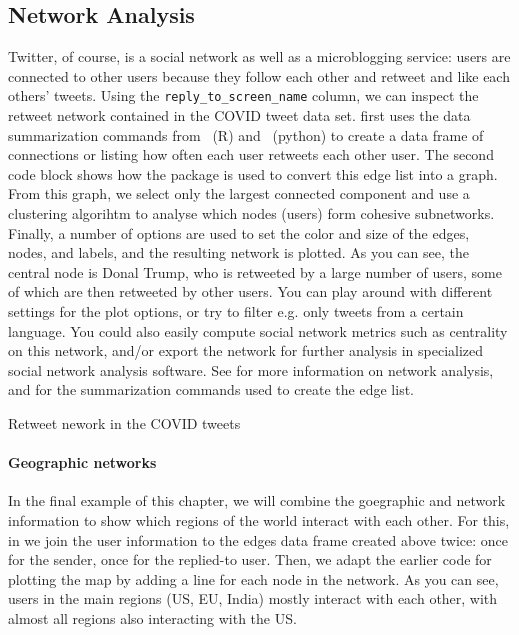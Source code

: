 
\subsection{Network Analysis}

Twitter, of course, is a social network as well as a microblogging service:
users are connected to other users because they follow each other and retweet and like each others' tweets.
Using the \verb+reply_to_screen_name+ column, we can inspect the retweet network contained in the COVID tweet data set.
 first uses the data summarization commands from \tidyverse\ (R) and \pandas\ (python) to
create a data frame of connections or  listing how often each user retweets each other user.
The second code block shows how the  package is used to convert this edge list into a graph.
From this graph, we select only the largest connected component and use a clustering algorihtm to analyse which
nodes (users) form cohesive subnetworks.
Finally, a number of options are used to set the color and size of the edges, nodes, and labels,
and the resulting network is plotted.
As you can see, the central node is Donal Trump, who is retweeted by a large number of users,
some of which are then retweeted by other users.
You can play around with different settings for the plot options,
or try to filter e.g. only tweets from a certain language. 
You could also easily compute social network metrics such as centrality on this network,
and/or export the network for further analysis in specialized social network analysis software.
See  for more information on network analysis,
and  for the summarization commands used to create the edge list.

\begin{ccsexample}
\caption{Retweet nework in the COVID tweets}\label{ex:fungraph}
\end{ccsexample}

\paragraph{Geographic networks}
In the final example of this chapter, we will combine the goegraphic and network information to
show which regions of the world interact with each other.
For this, in  we join the user information to the edges data frame created above twice:
once for the sender, once for the replied-to user.
Then, we adapt the earlier code for plotting the map by adding a line for each node in the network.
As you can see, users in the main regions (US, EU, India) mostly interact with each other,
with almost all regions also interacting with the US.

